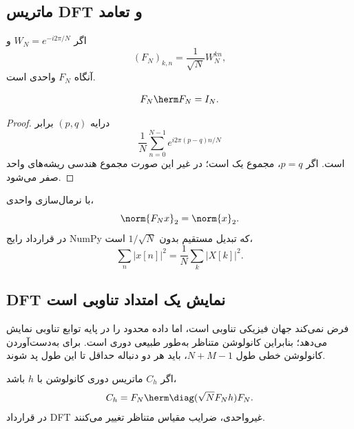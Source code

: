 \subsection{ماتریس DFT و تعامد}
اگر \(W_N=e^{-i2\pi/N}\) و
\begin{equation}
(F_N)_{k,n}=\frac{1}{\sqrt N}W_N^{kn},
\end{equation}
آنگاه \(F_N\) واحدی است.

\begin{theorem}
\begin{equation}
F_N\herm F_N=I_N.
\end{equation}
\end{theorem}

\begin{proof}
درایه \((p,q)\) برابر
\begin{equation}
\frac{1}{N}\sum_{n=0}^{N-1}e^{i2\pi(p-q)n/N}
\end{equation}
است. اگر \(p=q\)، مجموع یک است؛ در غیر این صورت مجموع هندسی ریشه‌های واحد صفر می‌شود.
\end{proof}

\begin{corollary}
با نرمال‌سازی واحدی،
\begin{equation}
\norm{F_Nx}_2=\norm{x}_2.
\end{equation}
در قرارداد رایج NumPy که تبدیل مستقیم بدون \(1/\sqrt N\) است،
\begin{equation}
\sum_n|x[n]|^2=\frac{1}{N}\sum_k|X[k]|^2.
\end{equation}
\end{corollary}

\subsection{DFT نمایش یک امتداد تناوبی است}
 فرض نمی‌کند جهان فیزیکی تناوبی است، اما داده محدود را در پایه توابع تناوبی نمایش می‌دهد؛
بنابراین کانولوشن متناظر به‌طور طبیعی دوری است. برای به‌دست‌آوردن کانولوشن خطی طول \(N+M-1\)، باید
هر دو دنباله حداقل تا این طول پد شوند.

\begin{theorem}
اگر \(C_h\) ماتریس دوری کانولوشن با \(h\) باشد،
\begin{equation}
C_h=F_N\herm\diag(\sqrt N F_Nh)F_N.
\label{eq:circulant-diag}
\end{equation}
در قرارداد DFT غیرواحدی، ضرایب مقیاس متناظر تغییر می‌کنند.
\end{theorem}

